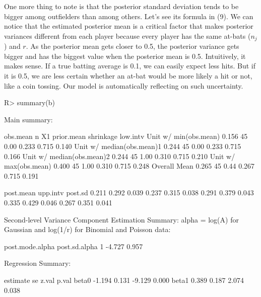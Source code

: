 \documentclass[article]{jss}
\begin{document}
One more thing to note is that the posterior standard deviation tends to be bigger among outfielders than among others. Let's see its formula in (9). We can notice that the estimated posterior mean is a critical factor that makes posterior variances different from each player because every player has the same at-bats ($n_{j}$) and $r$. As the posterior mean gets closer to 0.5, the posterior variance gets bigger and has the biggest value when the posterior mean is 0.5. Intuitively, it makes sense. If a true batting average is 0.1, we can easily expect less hits. But if it is 0.5, we are less certain whether an at-bat would be more likely a hit or not, like a coin tossing. Our model is automatically reflecting on such uncertainty.
\begin{CodeChunk}
\begin{CodeInput}
R> summary(b)
\end{CodeInput}
\begin{CodeOutput}
Main summary:

                          obs.mean  n   X1 prior.mean shrinkage low.intv
Unit w/ min(obs.mean)        0.156 45 0.00      0.233     0.715    0.140
Unit w/ median(obs.mean)1    0.244 45 0.00      0.233     0.715    0.166
Unit w/ median(obs.mean)2    0.244 45 1.00      0.310     0.715    0.210
Unit w/ max(obs.mean)        0.400 45 1.00      0.310     0.715    0.248
Overall Mean                 0.265 45 0.44      0.267     0.715    0.191

                         post.mean upp.intv post.sd
                             0.211    0.292   0.039
                             0.237    0.315   0.038
                             0.291    0.379   0.043
                             0.335    0.429   0.046
                             0.267    0.351   0.041

Second-level Variance Component Estimation Summary:
alpha = log(A) for Gaussian and log(1/r) for Binomial and Poisson data:

  post.mode.alpha post.sd.alpha
1          -4.727         0.957


Regression Summary:

      estimate    se  z.val p.val
beta0   -1.194 0.131 -9.129 0.000
beta1    0.389 0.187  2.074 0.038
\end{CodeOutput}
\end{CodeChunk}
\end{document}
